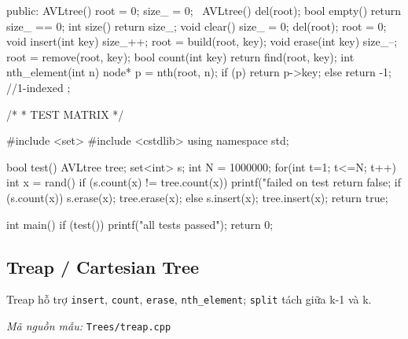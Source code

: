 \documentclass[11pt]{article}
\newcommand{\codepath}[1]{\par\noindent\textit{Mã nguồn mẫu:} \texttt{#1}\par}
\begin{document}
\begin{vncode}
{public:
    AVLtree() { root = 0; size_ = 0; }
    ~AVLtree() { del(root); }
    bool empty() { return size_ == 0; }
    int size() { return size_; }
    void clear() {
        size_ = 0;
        del(root);
        root = 0;
    }
    void insert(int key) {
        size_++;
        root = build(root, key);
    }
    void erase(int key) {
        size_--;
        root = remove(root, key);
    }
    bool count(int key) {
        return find(root, key);
    }
    int nth_element(int n) {
        node* p = nth(root, n);
        if (p) return p->key;
        else return -1;
    }   //1-indexed
};

/*
 * TEST MATRIX
 */

#include <set>
#include <cstdlib>
using namespace std;

bool test()
{
	AVLtree tree;
	set<int> s;
	int N = 1000000;
	for(int t=1; t<=N; t++) {
		int x = rand()%
		if (s.count(x) != tree.count(x)) {
			printf("failed on test %
			return false;
		}
		if (s.count(x)) {
			s.erase(x);
			tree.erase(x);
		}
		else{
			s.insert(x);
			tree.insert(x);
		}
	}
	return true;
}

int main()
{
	if (test()) {
		printf("all tests passed\n");
	}
	return 0;
}
\end{vncode}
\endgroup


\subsection{Treap / Cartesian Tree}

Treap hỗ trợ \texttt{insert}, \texttt{count}, \texttt{erase}, \texttt{nth\_element}; \texttt{split} tách giữa k-1 và k.

\codepath{Trees/treap.cpp}
\end{document}
